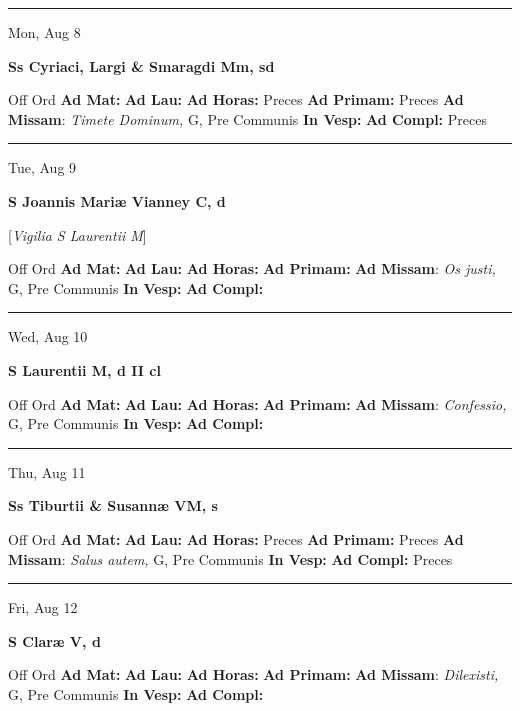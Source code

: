 \documentclass[letterpaper, 10pt]{article}
\begin{document}
\hrule
\begin{center}
Mon, Aug 8
\end{center}\textbf{ \large Ss Cyriaci, Largi \& Smaragdi Mm, \textnormal{\normalsize sd}}
\begin{justify}
Off Ord
\textbf{Ad Mat: }
\textbf{Ad Lau: }
\textbf{Ad Horas: }Preces
\textbf{Ad Primam: }Preces
\textbf{Ad Missam}: \textit{Timete Dominum,} G, Pre Communis
\textbf{In Vesp: }
\textbf{Ad Compl: }Preces\end{justify}



\hrule
\begin{center}
Tue, Aug 9
\end{center}\textbf{ \large S Joannis Mariæ Vianney C, \textnormal{\normalsize d}}

[\textit{Vigilia S Laurentii M}]
\begin{justify}
Off Ord
\textbf{Ad Mat: }
\textbf{Ad Lau: }
\textbf{Ad Horas: }
\textbf{Ad Primam: }
\textbf{Ad Missam}: \textit{Os justi,} G, Pre Communis
\textbf{In Vesp: }
\textbf{Ad Compl: }\end{justify}



\hrule
\begin{center}
Wed, Aug 10
\end{center}\textbf{ \large S Laurentii M, \textnormal{\normalsize d II cl}}
\begin{justify}
Off Ord
\textbf{Ad Mat: }
\textbf{Ad Lau: }
\textbf{Ad Horas: }
\textbf{Ad Primam: }
\textbf{Ad Missam}: \textit{Confessio,} G, Pre Communis
\textbf{In Vesp: }
\textbf{Ad Compl: }\end{justify}



\hrule
\begin{center}
Thu, Aug 11
\end{center}\textbf{ \large Ss Tiburtii \& Susannæ VM, \textnormal{\normalsize s}}
\begin{justify}
Off Ord
\textbf{Ad Mat: }
\textbf{Ad Lau: }
\textbf{Ad Horas: }Preces
\textbf{Ad Primam: }Preces
\textbf{Ad Missam}: \textit{Salus autem,} G, Pre Communis
\textbf{In Vesp: }
\textbf{Ad Compl: }Preces\end{justify}



\hrule
\begin{center}
Fri, Aug 12
\end{center}\textbf{ \large S Claræ V, \textnormal{\normalsize d}}
\begin{justify}
Off Ord
\textbf{Ad Mat: }
\textbf{Ad Lau: }
\textbf{Ad Horas: }
\textbf{Ad Primam: }
\textbf{Ad Missam}: \textit{Dilexisti,} G, Pre Communis
\textbf{In Vesp: }
\textbf{Ad Compl: }\end{justify}
\end{document}
